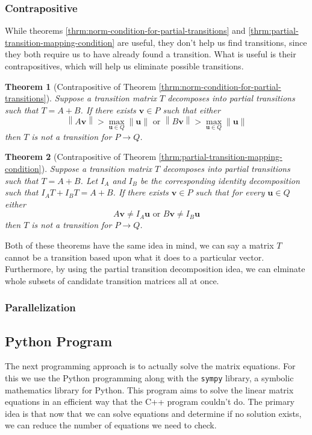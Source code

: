 \documentclass[a4paper,10pt]{article}
\theoremstyle{plain}
\newtheorem{Theorem}{Theorem}
\theoremstyle{definition}
\theoremstyle{remark}
\renewcommand{\vec}[1]{\mathbf{#1}}
\newcommand\norm[1]{\left\lVert#1\right\rVert}
\begin{document}
\subsubsection{Contrapositive}
While theorems \ref{thrm:norm-condition-for-partial-transitions} and \ref{thrm:partial-transition-mapping-condition} are useful, they don't help us find transitions, since they both require us to have already found a transition.
What is useful is their contrapositives, which will help us eliminate possible transitions.
\begin{Theorem}[Contrapositive of Theorem \ref{thrm:norm-condition-for-partial-transitions}]
	Suppose a transition matrix \( T \) decomposes into partial transitions such that \( T = A + B \).
	If there exists \( \vec{v} \in P \) such that either
	\[\norm{A\vec{v}} > \max_{\vec{u} \in Q}\norm{\vec{u}} \text{ or } \norm{B\vec{v}} > \max_{\vec{u} \in Q}\norm{\vec{u}}\]
	then \( T \) is not a transition for \( P \to Q \).
	\label{thrm:contrapositive-norm-condition-for-partial-transitions}
\end{Theorem}
\begin{Theorem}[Contrapositive of Theorem \ref{thrm:partial-transition-mapping-condition}]
	Suppose a transition matrix \( T \) decomposes into partial transitions such that \( T = A + B \).
	Let \( I_A \) and \( I_B \) be the corresponding identity decomposition such that \( I_AT + I_BT = A + B \).
	If there exists \( \vec{v} \in P \) such that for every \( \vec{u} \in Q \) either
	\[A\vec{v} \neq I_A\vec{u} \text{ or } B\vec{v} \neq I_B\vec{u}\]
	then \( T \) is not a transition for \( P \to Q \).
	\label{thrm:contrapositive-partial-transition-mapping-condition}
\end{Theorem}
Both of these theorems have the same idea in mind, we can say a matrix \( T \) cannot be a transition based upon what it does to a particular vector.
Furthermore, by using the partial transition decomposition idea, we can elminate whole subsets of candidate transition matrices all at once.



\subsubsection{Parallelization}

\subsection{Python Program}
The next programming approach is to actually solve the matrix equations.
For this we use the Python programming along with the \texttt{sympy} library, a symbolic mathematics library for Python.
This program aims to solve the linear matrix equations in an efficient way that the C++ program couldn't do.
The primary idea is that now that we can solve equations and determine if no solution exists, we can reduce the number of equations we need to check.
\end{document}
